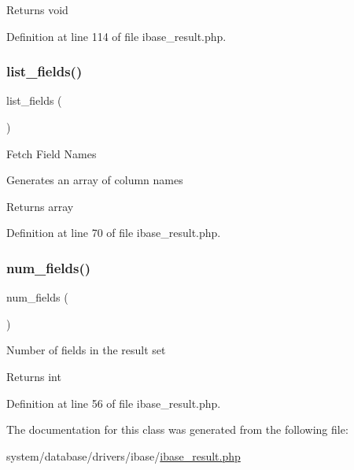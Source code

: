\begin{DoxyReturn}{Returns}
void 
\end{DoxyReturn}


Definition at line 114 of file ibase\+\_\+result.\+php.

\mbox{\label{class_c_i___d_b__ibase__result_a50b54eb4ea7cfd039740f532988ea776}} 
\subsubsection{\texorpdfstring{list\_fields()}{list\_fields()}}
{\footnotesize\ttfamily list\+\_\+fields (\begin{DoxyParamCaption}{ }\end{DoxyParamCaption})}

Fetch Field Names

Generates an array of column names

\begin{DoxyReturn}{Returns}
array 
\end{DoxyReturn}


Definition at line 70 of file ibase\+\_\+result.\+php.

\mbox{\label{class_c_i___d_b__ibase__result_af831bf363e4d7d661a717a4932af449d}} 
\subsubsection{\texorpdfstring{num\_fields()}{num\_fields()}}
{\footnotesize\ttfamily num\+\_\+fields (\begin{DoxyParamCaption}{ }\end{DoxyParamCaption})}

Number of fields in the result set

\begin{DoxyReturn}{Returns}
int 
\end{DoxyReturn}


Definition at line 56 of file ibase\+\_\+result.\+php.



The documentation for this class was generated from the following file\+:\begin{DoxyCompactItemize}
\item 
system/database/drivers/ibase/\mbox{\hyperlink{ibase__result_8php}{ibase\+\_\+result.\+php}}\end{DoxyCompactItemize}
